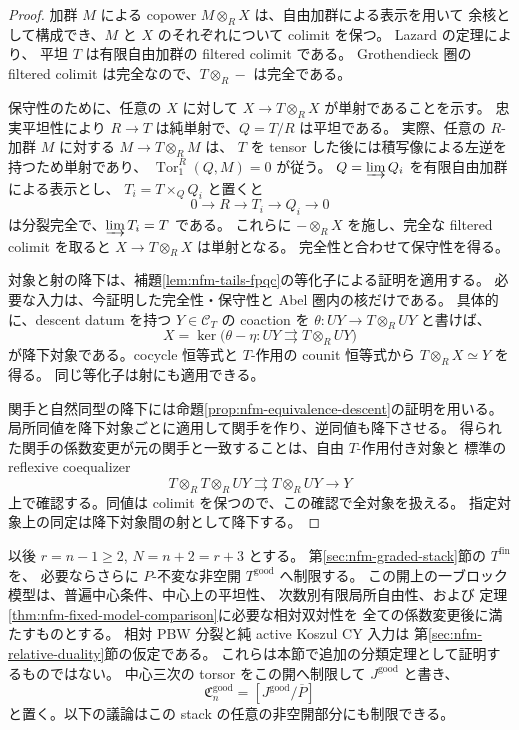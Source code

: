 \begin{proof}
加群 $M$ による copower $M\otimes_R X$ は、自由加群による表示を用いて
余核として構成でき、$M$ と $X$ のそれぞれについて colimit を保つ。
Lazard の定理\cite[Theorem~10.81.4, Tag~058G]{NFMStacksLazard}により、
平坦 $T$ は有限自由加群の filtered colimit である。
Grothendieck 圏の filtered colimit は完全なので、$T\otimes_R-$ は完全である。

保守性のために、任意の $X$ に対して $X\to T\otimes_RX$ が単射であることを示す。
忠実平坦性により $R\to T$ は純単射で、$Q=T/R$ は平坦である。
実際、任意の $R$-加群 $M$ に対する $M\to T\otimes_RM$ は、
$T$ を tensor した後には積写像による左逆を持つため単射であり、
$\operatorname{Tor}_1^R(Q,M)=0$ が従う。
$Q=\varinjlim Q_i$ を有限自由加群による表示とし、
$T_i=T\times_QQ_i$ と置くと
\[
 0\longrightarrow R\longrightarrow T_i\longrightarrow Q_i\longrightarrow0
\]
は分裂完全で、$\varinjlim T_i=T$ である。
これらに $-\otimes_RX$ を施し、完全な filtered colimit を取ると
$X\to T\otimes_RX$ は単射となる。
完全性と合わせて保守性を得る。

対象と射の降下は、補題\ref{lem:nfm-tails-fpqc}の等化子による証明を適用する。
必要な入力は、今証明した完全性・保守性と Abel 圏内の核だけである。
具体的に、descent datum を持つ $Y\in\mathcal C_T$ の coaction を
$\theta:UY\to T\otimes_RUY$ と書けば、
\[
 X=\ker\bigl(\theta-\eta:UY\rightrightarrows T\otimes_RUY\bigr)
\]
が降下対象である。cocycle 恒等式と $T$-作用の counit 恒等式から
$T\otimes_RX\simeq Y$ を得る。
同じ等化子は射にも適用できる。

関手と自然同型の降下には命題\ref{prop:nfm-equivalence-descent}の証明を用いる。
局所同値を降下対象ごとに適用して関手を作り、逆同値も降下させる。
得られた関手の係数変更が元の関手と一致することは、自由 $T$-作用付き対象と
標準の reflexive coequalizer
\[
 T\otimes_RT\otimes_RUY\rightrightarrows T\otimes_RUY\longrightarrow Y
\]
上で確認する。同値は colimit を保つので、この確認で全対象を扱える。
指定対象上の同定は降下対象間の射として降下する。
\end{proof}

以後 $r=n-1\ge2$, $N=n+2=r+3$ とする。
第\ref{sec:nfm-graded-stack}節の $T^{\mathrm{fin}}$ を、
必要ならさらに $P$-不変な非空開 $T^{\mathrm{good}}$ へ制限する。
この開上の一ブロック模型は、普遍中心条件、中心上の平坦性、
次数別有限局所自由性、および
定理\ref{thm:nfm-fixed-model-comparison}に必要な相対双対性を
全ての係数変更後に満たすものとする。
相対 PBW 分裂と純 active Koszul CY 入力は
第\ref{sec:nfm-relative-duality}節の仮定である。
これらは本節で追加の分類定理として証明するものではない。
中心三次の torsor をこの開へ制限して $J^{\mathrm{good}}$ と書き、
\[
 \mathfrak C_n^{\mathrm{good}}=[J^{\mathrm{good}}/\overline P]
\]
と置く。以下の議論はこの stack の任意の非空開部分にも制限できる。

